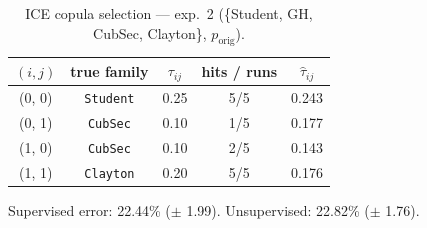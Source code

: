 \begin{table}[htbp]
  \centering
  \caption{ICE copula selection — exp.\ 2 (\{Student, GH, CubSec, Clayton\}, $p_{\text{orig}}$).}
  \label{tab:exp3-exp2_orig_p}
  \begin{tabular}{ccccc}
    \toprule
    $(i, j)$ & true family & $\tau_{ij}$ & hits / runs & $\hat\tau_{ij}$ \\
    \midrule
    (0, 0) & \texttt{Student} & 0.25 & 5/5 & 0.243 \\
    (0, 1) & \texttt{CubSec} & 0.10 & 1/5 & 0.177 \\
    (1, 0) & \texttt{CubSec} & 0.10 & 2/5 & 0.143 \\
    (1, 1) & \texttt{Clayton} & 0.20 & 5/5 & 0.176 \\
    \bottomrule
  \end{tabular}
  \par\smallskip Supervised error: 22.44\% ($\pm$ 1.99). Unsupervised: 22.82\% ($\pm$ 1.76).
\end{table}
